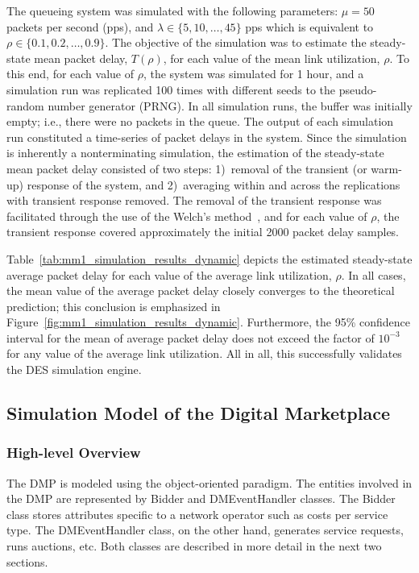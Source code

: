 The queueing system was simulated with the following parameters: $\mu=50$ packets per second (pps), and $\lambda\in\{5,10,\ldots,45\}$ pps which is equivalent to $\rho\in\{0.1,0.2,\ldots,0.9\}$. The objective of the simulation was to estimate the steady-state mean packet delay, $T(\rho)$, for each value of the mean link utilization, $\rho$. To this end, for each value of $\rho$, the system was simulated for 1 hour, and a simulation run was replicated 100 times with different seeds to the pseudo-random number generator (PRNG). In all simulation runs, the buffer was initially empty; i.e., there were no packets in the queue. The output of each simulation run constituted a time-series of packet delays in the system. Since the simulation is inherently a nonterminating simulation, the estimation of the steady-state mean packet delay consisted of two steps: 1)~removal of the transient (or warm-up) response of the system, and 2)~averaging within and across the replications with transient response removed. The removal of the transient response was facilitated through the use of the Welch's method~\cite{LawChapter92007}, and for each value of $\rho$, the transient response covered approximately the initial 2000 packet delay samples.

Table~\ref{tab:mm1_simulation_results_dynamic} depicts the estimated steady-state average packet delay for each value of the average link utilization, $\rho$. In all cases, the mean value of the average packet delay closely converges to the theoretical prediction; this conclusion is emphasized in Figure~\ref{fig:mm1_simulation_results_dynamic}. Furthermore, the 95\% confidence interval for the mean of average packet delay does not exceed the factor of $10^{-3}$ for any value of the average link utilization. All in all, this successfully validates the DES simulation engine.

\subsection{Simulation Model of the Digital Marketplace} %
\label{sub:simulation_model_of_the_digital_marketplace_dynamic}

\subsubsection{High-level Overview} %
\label{ssub:high_level_overview_dynamic}
The DMP is modeled using the object-oriented paradigm. The entities involved in the DMP are represented by Bidder and DMEventHandler classes. The Bidder class stores attributes specific to a network operator such as costs per service type. The DMEventHandler class, on the other hand, generates service requests, runs auctions, etc. Both classes are described in more detail in the next two sections.

